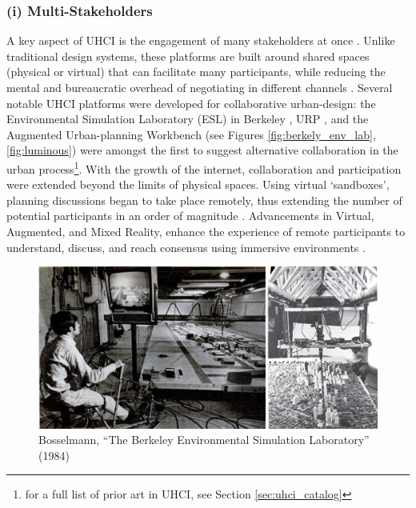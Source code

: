 {    \subsubsection{(i) Multi-Stakeholders}
    {
        A key aspect of UHCI is the engagement of many stakeholders at once \cite{Ben-Joseph2004}. Unlike traditional design systems, these platforms are built around shared spaces (physical or virtual) that can facilitate many participants, while reducing the mental and bureaucratic overhead of negotiating in different channels \cite{ben-joseph2001}. Several notable UHCI platforms were developed for collaborative urban-design: the Environmental Simulation Laboratory (ESL) in Berkeley \cite{bosselmann1984berkeley}, URP \cite{underkoffler1997view}, and the Augmented Urban-planning Workbench \cite{Ben-Joseph2004} (see Figures \eqref{fig:berkely_env_lab}, \eqref{fig:luminous}) were amongst the first to suggest alternative collaboration in the urban process\footnote{for a full list of prior art in UHCI, see Section \eqref{sec:uhci_catalog}}. With the growth of the internet, collaboration and participation were extended beyond the limits of physical spaces. Using virtual `sandboxes', planning discussions began to take place remotely, thus extending the number of potential participants in an order of magnitude \cite{Ben-Joseph2013, banerjee2011companion, green2019smart}. Advancements in Virtual, Augmented, and Mixed Reality, enhance the experience of remote participants to understand, discuss, and reach consensus using immersive environments \cite{bulmer_how_2001, noyman2018CityScopeARUD}.

        \begin{figure}[h]
            \begin{center}
                \includegraphics[width=1\textwidth]{chapters/introduction/figures/berkely_env_lab.png}
            \end{center}
            \caption{Bosselmann, ``The Berkeley Environmental Simulation Laboratory'' (1984) \cite{bosselmann1984berkeley}}
            \label{fig:berkely_env_lab}
        \end{figure}

}}
